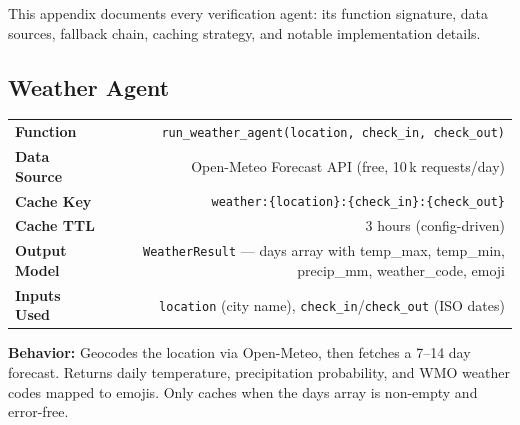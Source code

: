 \documentclass[11pt,a4paper]{article}
\begin{document}
This appendix documents every verification agent: its function signature, data sources, fallback chain, caching strategy, and notable implementation details.

\subsection{Weather Agent}
\begin{infobox}
{\small
\begin{tabularx}{\textwidth}{@{}L{3cm}R@{}}
\textbf{Function}     & \texttt{run\_weather\_agent(location, check\_in, check\_out)} \\[3pt]
\textbf{Data Source}   & Open-Meteo Forecast API (free, 10\,k requests/day) \\[3pt]
\textbf{Cache Key}     & \texttt{weather:\{location\}:\{check\_in\}:\{check\_out\}} \\[3pt]
\textbf{Cache TTL}     & 3 hours (config-driven) \\[3pt]
\textbf{Output Model}  & \texttt{WeatherResult} --- days array with temp\_max, temp\_min, precip\_mm, weather\_code, emoji \\[3pt]
\textbf{Inputs Used}   & \texttt{location} (city name), \texttt{check\_in}/\texttt{check\_out} (ISO dates) \\
\end{tabularx}}

\textbf{Behavior:} Geocodes the location via Open-Meteo, then fetches a 7--14 day forecast. Returns daily temperature, precipitation probability, and WMO weather codes mapped to emojis. Only caches when the days array is non-empty and error-free.
\end{infobox}

\end{document}
